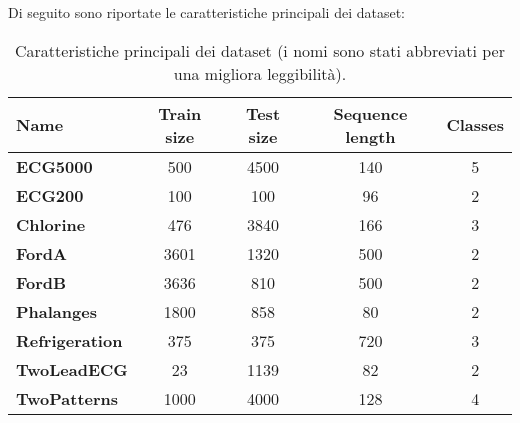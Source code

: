 Di seguito sono riportate le caratteristiche principali dei dataset:
\begin{table}[H]
	\centering
	\begin{tabularx}{\textwidth}{X c c c c}
		\hline
		\textbf{Name} & \textbf{Train size} & \textbf{Test size} & \textbf{Sequence length} & \textbf{Classes} \\
		\hline
		\textbf{ECG5000} & 500 & 4500 & 140 & 5\\
		\textbf{ECG200} & 100 & 100 & 96 & 2\\
		\textbf{Chlorine} & 476 & 3840 & 166 & 3\\
		\textbf{FordA} & 3601 & 1320 & 500 & 2\\
		\textbf{FordB} & 3636 & 810 & 500 & 2\\
		\textbf{Phalanges} & 1800 & 858 & 80 & 2\\
		\textbf{Refrigeration} & 375 & 375 & 720 & 3\\
		\textbf{TwoLeadECG} & 23 & 1139 & 82 & 2\\
		\textbf{TwoPatterns} & 1000 & 4000 & 128 & 4\\
	\end{tabularx}
	\caption{Caratteristiche principali dei dataset (i nomi sono stati abbreviati per una migliora leggibilità).}
	\label{tab:datasets}
\end{table}

